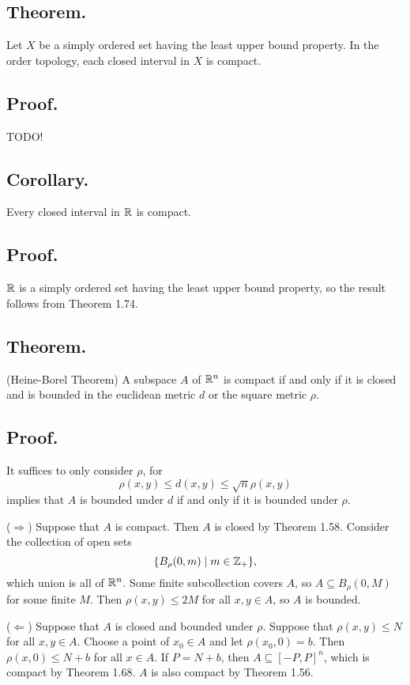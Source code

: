 \documentclass[titlepage]{article}
\begin{document}
\subsection{Theorem.} Let $X$ be a simply ordered set having the least upper bound property. In the order topology, each closed interval in $X$ is compact.

\subsection{Proof.} TODO!

\subsection{Corollary.} Every closed interval in $\mathbb{R}$ is compact.

\subsection{Proof.} $\mathbb{R}$ is a simply ordered set having the least upper bound property, so the result follows from Theorem 1.74.

\subsection{Theorem.} (Heine-Borel Theorem) A subspace $A$ of $\mathbb{R}^{n}$ is compact if and only if it is closed and is bounded in the euclidean metric $d$ or the square metric $\rho$.

\subsection{Proof.} It suffices to only consider $\rho$, for 
$$\rho(x, y) \leq d(x, y) \leq \sqrt{n} \rho(x, y)$$
implies that $A$ is bounded under $d$ if and only if it is bounded under $\rho$.

($\Rightarrow$) Suppose that $A$ is compact. Then $A$ is closed by Theorem 1.58. Consider the collection of open sets 
$$\{B_{\rho}(0, m) \mid m \in \mathbb{Z}_{+}\},$$
which union is all of $\mathbb{R}^{n}$. Some finite subcollection covers $A$, so $A \subseteq B_{\rho}(0, M)$ for some finite $M$. Then $\rho(x, y) \leq 2M$ for all $x, y \in A$, so $A$ is bounded.

($\Leftarrow$) Suppose that $A$ is closed and bounded under $\rho$. Suppose that $\rho(x, y) \leq N$ for all $x, y \in A$. Choose a point of $x_{0} \in A$ and let $\rho(x_{0}, 0) = b$. Then $\rho(x, 0) \leq N + b$ for all $x \in A$. If $P = N + b$, then $A \subseteq [-P, P]^{n}$, which is compact by Theorem 1.68. $A$ is also compact by Theorem 1.56.
\end{document}
